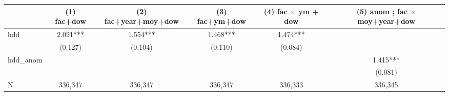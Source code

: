 \begin{tabular}{lccccc}
\hline
 & (1) fac+dow & (2) fac+year+moy+dow & (3) fac+ym+dow & (4) fac $\times$ ym + dow & (5) anom ; fac $\times$ moy+year+dow \\
\hline
hdd & 2.021*** & 1.554*** & 1.468*** & 1.474*** &  \\
 & (0.127) & (0.104) & (0.110) & (0.084) &  \\
hdd\_anom &  &  &  &  & 1.415*** \\
 &  &  &  &  & (0.081) \\
\hline
N & 336,347 & 336,347 & 336,347 & 336,333 & 336,345 \\
\hline
\end{tabular}
